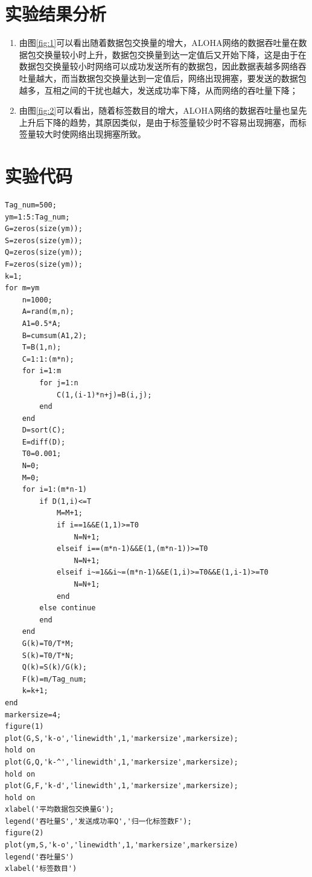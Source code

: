 \documentclass[a4paper]{ctexart}
\begin{document}
\section{实验结果分析}
\begin{enumerate}
	\item 由图\ref{fig:1}可以看出随着数据包交换量的增大，ALOHA网络的数据吞吐量在数据包交换量较小时上升，数据包交换量到达一定值后又开始下降，这是由于在数据包交换量较小时网络可以成功发送所有的数据包，因此数据表越多网络吞吐量越大，而当数据包交换量达到一定值后，网络出现拥塞，要发送的数据包越多，互相之间的干扰也越大，发送成功率下降，从而网络的吞吐量下降；
	\item 由图\ref{fig:2}可以看出，随着标签数目的增大，ALOHA网络的数据吞吐量也呈先上升后下降的趋势，其原因类似，是由于标签量较少时不容易出现拥塞，而标签量较大时使网络出现拥塞所致。
\end{enumerate}

\newpage
\appendix
\appendixpage
\section{实验代码}
\begin{lstlisting}
Tag_num=500;
ym=1:5:Tag_num;
G=zeros(size(ym));
S=zeros(size(ym));
Q=zeros(size(ym));
F=zeros(size(ym));
k=1;
for m=ym
	n=1000;
	A=rand(m,n);
	A1=0.5*A;
	B=cumsum(A1,2);
	T=B(1,n);
	C=1:1:(m*n);
	for i=1:m
		for j=1:n
			C(1,(i-1)*n+j)=B(i,j);
		end
	end
	D=sort(C);
	E=diff(D);
	T0=0.001;
	N=0;
	M=0;
	for i=1:(m*n-1)
		if D(1,i)<=T
			M=M+1;
			if i==1&&E(1,1)>=T0
				N=N+1;
			elseif i==(m*n-1)&&E(1,(m*n-1))>=T0
				N=N+1;
			elseif i~=1&&i~=(m*n-1)&&E(1,i)>=T0&&E(1,i-1)>=T0
				N=N+1;
			end
		else continue
		end
	end
	G(k)=T0/T*M;
	S(k)=T0/T*N;
	Q(k)=S(k)/G(k);
	F(k)=m/Tag_num;
	k=k+1;
end
markersize=4;
figure(1)
plot(G,S,'k-o','linewidth',1,'markersize',markersize);
hold on
plot(G,Q,'k-^','linewidth',1,'markersize',markersize);
hold on
plot(G,F,'k-d','linewidth',1,'markersize',markersize);
hold on
xlabel('平均数据包交换量G');
legend('吞吐量S','发送成功率Q','归一化标签数F');
figure(2)
plot(ym,S,'k-o','linewidth',1,'markersize',markersize)
legend('吞吐量S')
xlabel('标签数目')
\end{lstlisting} 
\end{document}
